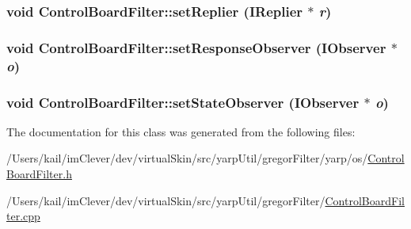 \label{classyarp_1_1os_1_1_control_board_filter_a2500ae8300c6ca835f5b25133e1d04ed}
\hypertarget{classyarp_1_1os_1_1_control_board_filter_a6d3b3916553af9221093518d93c49c99}{
\subsubsection[{setReplier}]{\setlength{\rightskip}{0pt plus 5cm}void ControlBoardFilter::setReplier ({\bf IReplier} $\ast$ {\em r})}}
\label{classyarp_1_1os_1_1_control_board_filter_a6d3b3916553af9221093518d93c49c99}
\hypertarget{classyarp_1_1os_1_1_control_board_filter_acf3896d97b179e36d41d275087c33c4e}{
\subsubsection[{setResponseObserver}]{\setlength{\rightskip}{0pt plus 5cm}void ControlBoardFilter::setResponseObserver ({\bf IObserver} $\ast$ {\em o})}}
\label{classyarp_1_1os_1_1_control_board_filter_acf3896d97b179e36d41d275087c33c4e}
\hypertarget{classyarp_1_1os_1_1_control_board_filter_af23fad9bab89b2a57c4fb32eb99d76ef}{
\subsubsection[{setStateObserver}]{\setlength{\rightskip}{0pt plus 5cm}void ControlBoardFilter::setStateObserver ({\bf IObserver} $\ast$ {\em o})}}
\label{classyarp_1_1os_1_1_control_board_filter_af23fad9bab89b2a57c4fb32eb99d76ef}


The documentation for this class was generated from the following files:\begin{DoxyCompactItemize}
\item 
/Users/kail/imClever/dev/virtualSkin/src/yarpUtil/gregorFilter/yarp/os/\hyperlink{_control_board_filter_8h}{ControlBoardFilter.h}\item 
/Users/kail/imClever/dev/virtualSkin/src/yarpUtil/gregorFilter/\hyperlink{_control_board_filter_8cpp}{ControlBoardFilter.cpp}\end{DoxyCompactItemize}
